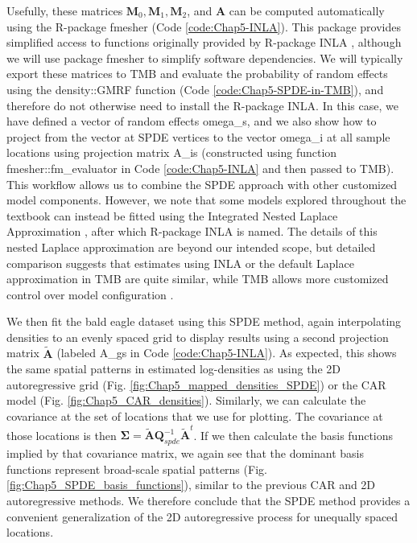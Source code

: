 Usefully, these matrices \(\mathbf{M}_0, \mathbf{M}_1, \mathbf{M}_2\), and \(\mathbf{A} \) can be computed automatically using the R-package \colorbox{backcolour}{fmesher} \cite{lindgren_fmesher_2023} (Code \ref{code:Chap5-INLA}).  This package provides simplified access to functions originally provided by R-package \colorbox{backcolour}{INLA} \cite{lindgren_continuous_2012}, although we will use package \colorbox{backcolour}{fmesher} to simplify software dependencies.  We will typically export these matrices to TMB and evaluate the probability of random effects using the \colorbox{backblue}{density::GMRF} function (Code \ref{code:Chap5-SPDE-in-TMB}), and therefore do not otherwise need to install the R-package \colorbox{backcolour}{INLA}.  In this case, we have defined a vector of random effects \colorbox{backblue}{omega\_s}, and we also show how to project from the vector at SPDE vertices to the vector \colorbox{backblue}{omega\_i} at all sample locations using projection matrix \colorbox{backblue}{A\_is} (constructed using function \colorbox{backcolour}{fmesher::fm\_evaluator} in Code \ref{code:Chap5-INLA} and then passed to TMB).  This workflow allows us to combine the SPDE approach with other customized model components.  However, we note that some models explored throughout the textbook can instead be fitted using the Integrated Nested Laplace Approximation \cite{rue_approximate_2009}, after which R-package INLA is named.  The details of this nested Laplace approximation are beyond our intended scope, but detailed comparison suggests that estimates using INLA or the default Laplace approximation in TMB are quite similar, while TMB allows more customized control over model configuration \cite{osgood-zimmerman_statistical_2023}.  

\lstset{style=TMBcode}


We then fit the bald eagle dataset using this SPDE method, again interpolating densities to an evenly spaced grid to display results using a second projection matrix \(\tilde{\mathbf{A}}\) (labeled \colorbox{backcolour}{A\_gs} in Code \ref{code:Chap5-INLA}).  As expected, this shows the same spatial patterns in estimated log-densities as using the 2D autoregressive grid (Fig. \ref{fig:Chap5_mapped_densities_SPDE}) or the CAR model (Fig. \ref{fig:Chap5_CAR_densities}).  Similarly, we can calculate the covariance at the set of locations that we use for plotting.  The covariance at those locations is then \( \mathbf{\Sigma} = \tilde{\mathbf{A}} \mathbf{Q}_{spde}^{-1} \tilde{\mathbf{A}}^t \).  If we then calculate the basis functions implied by that covariance matrix, we again see that the dominant basis functions represent broad-scale spatial patterns (Fig. \ref{fig:Chap5_SPDE_basis_functions}), similar to the previous CAR and 2D autoregressive methods.  We therefore conclude that the SPDE method provides a convenient generalization of the 2D autoregressive process for unequally spaced locations.  

